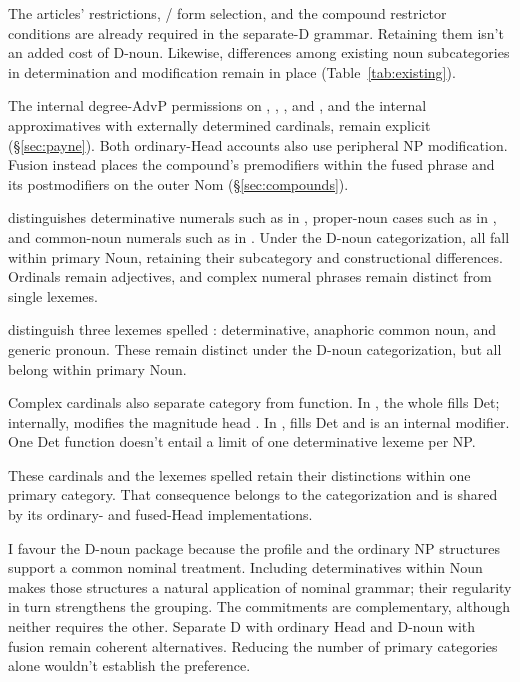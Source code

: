 \documentclass[12pt]{article}
\begin{document}
The articles' restrictions, / form selection, and the compound restrictor conditions are already required in the separate-D grammar. Retaining them isn't an added cost of D-noun. Likewise, differences among existing noun subcategories in determination and modification remain in place (Table~\ref{tab:existing}).

The internal degree-AdvP permissions on , , , and , and the internal approximatives with externally determined cardinals, remain explicit (§\ref{sec:payne}). Both ordinary-Head accounts also use peripheral NP modification. Fusion instead places the compound's premodifiers within the fused phrase and its postmodifiers on the outer Nom (§\ref{sec:compounds}).

\textcite{reynolds2026numerals} distinguishes determinative numerals such as  in , proper-noun cases such as  in , and common-noun numerals such as  in . Under the D-noun categorization, all fall within primary Noun, retaining their subcategory and constructional differences. Ordinals remain adjectives, and complex numeral phrases remain distinct from single lexemes.

\textcite[797--798]{payne2013anaphoric} distinguish three lexemes spelled : determinative, anaphoric common noun, and generic pronoun. These remain distinct under the D-noun categorization, but all belong within primary Noun.

Complex cardinals also separate category from function. In , the whole  fills Det; internally,  modifies the magnitude head  \citep[§4]{reynolds2026numerals}. In ,  fills Det and  is an internal modifier. One Det function doesn't entail a limit of one determinative lexeme per NP.

These cardinals and the lexemes spelled  retain their distinctions within one primary category. That consequence belongs to the categorization and is shared by its ordinary- and fused-Head implementations.

I favour the D-noun package because the profile and the ordinary NP structures support a common nominal treatment. Including determinatives within Noun makes those structures a natural application of nominal grammar; their regularity in turn strengthens the grouping. The commitments are complementary, although neither requires the other. Separate D with ordinary Head and D-noun with fusion remain coherent alternatives. Reducing the number of primary categories alone wouldn't establish the preference.
\end{document}
